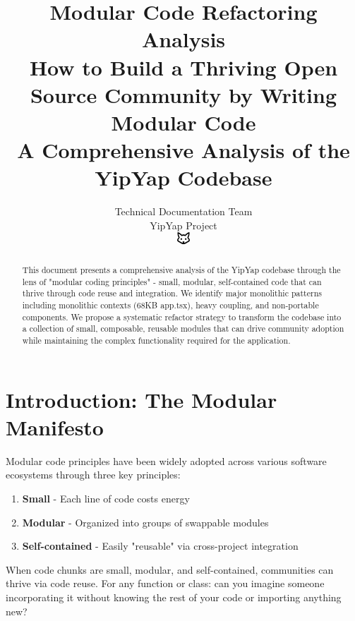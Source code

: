 \documentclass[11pt]{article}
\begin{document}
\title{\textbf{Modular Code Refactoring Analysis} \\
\Large{How to Build a Thriving Open Source Community by Writing Modular Code} \\
\large{A Comprehensive Analysis of the YipYap Codebase}}

\author{Technical Documentation Team\\
YipYap Project\\
\includegraphics[width=0.5cm]{favicon.pdf}}

\maketitle

\begin{abstract}
This document presents a comprehensive analysis of the YipYap codebase through the lens of "modular coding principles" - small, modular, self-contained code that can thrive through code reuse and integration. We identify major monolithic patterns including monolithic contexts (68KB app.tsx), heavy coupling, and non-portable components. We propose a systematic refactor strategy to transform the codebase into a collection of small, composable, reusable modules that can drive community adoption while maintaining the complex functionality required for the application.
\end{abstract}

\tableofcontents
\newpage

\section{Introduction: The Modular Manifesto}

Modular code principles have been widely adopted across various software ecosystems through three key principles:

\begin{enumerate}
\item \textbf{Small} - Each line of code costs energy
\item \textbf{Modular} - Organized into groups of swappable modules  
\item \textbf{Self-contained} - Easily "reusable" via cross-project integration
\end{enumerate}

When code chunks are small, modular, and self-contained, communities can thrive via code reuse. For any function or class: can you imagine someone incorporating it without knowing the rest of your code or importing anything new?
\end{document}
